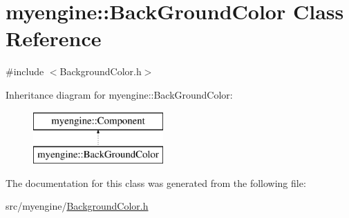 \hypertarget{classmyengine_1_1_back_ground_color}{}\section{myengine\+:\+:Back\+Ground\+Color Class Reference}
\label{classmyengine_1_1_back_ground_color}


{\ttfamily \#include $<$Background\+Color.\+h$>$}

Inheritance diagram for myengine\+:\+:Back\+Ground\+Color\+:\begin{figure}[H]
\begin{center}
\leavevmode
\includegraphics[height=2.000000cm]{classmyengine_1_1_back_ground_color}
\end{center}
\end{figure}


The documentation for this class was generated from the following file\+:\begin{DoxyCompactItemize}
\item 
src/myengine/\hyperlink{_background_color_8h}{Background\+Color.\+h}\end{DoxyCompactItemize}
